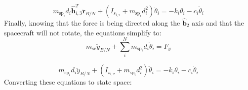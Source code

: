 \begin{equation}
m_{\text{sp}_i} d_i \hat{\bm h}_{i,3}^{T} \ddot{\bm r}_{B/N} 
+ \left( I_{s_{i,2}} + m_{\text{sp}_i} d_i^{2} \right) \ddot \theta_i 
= - k_i \theta_i - c_i \dot\theta_i  
\label{eq:solar_panel_final10}
\end{equation}
Finally, knowing that the force is being directed along the $\hat{\bm b}_2$ axis and that the spacecraft will not rotate, the equations simplify to:
\begin{equation}
m_{\text{sc}} \ddot{y}_{B/N}+\sum_{i}^{N}m_{\text{sp}_i} d_i \ddot{\theta}_i = F_{y}
\label{eq:Rbddot9}
\end{equation}

\begin{equation}
m_{\text{sp}_i} d_i \ddot{y}_{B/N} 
+ \left( I_{s_{i,2}} + m_{\text{sp}_i} d_i^{2} \right) \ddot \theta_i 
= - k_i \theta_i - c_i \dot\theta_i  
\label{eq:solar_panel_final12}
\end{equation}
Converting these equations to state space:
